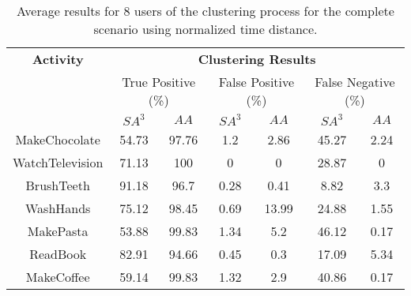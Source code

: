 \begin{table}[htbp]\scriptsize
  \begin{center}
        \begin{tabular}{ccccccc}
            \hline            
            \textbf{Activity} & \multicolumn{6}{c}{\textbf{Clustering Results}} \\
             & \multicolumn{2}{c}{True Positive (\%)} & \multicolumn{2}{c}{False Positive (\%)} & \multicolumn{2}{c}{False Negative (\%)} \\
             & $SA^3$ & $AA$ & $SA^3$ & $AA$ & $SA^3$ & $AA$ \\
            \hline
            MakeChocolate   & 54.73 & 97.76 & 1.2  & 2.86 & 45.27 & 2.24 \\
	    WatchTelevision & 71.13 & 100   & 0    & 0    & 28.87 & 0    \\
	    BrushTeeth      & 91.18 & 96.7  & 0.28 & 0.41 & 8.82  & 3.3 \\
	    WashHands       & 75.12 & 98.45 & 0.69 & 13.99  & 24.88 & 1.55 \\
	    MakePasta       & 53.88 & 99.83 & 1.34 & 5.2 & 46.12 & 0.17 \\
	    ReadBook        & 82.91 & 94.66 & 0.45 & 0.3  & 17.09 & 5.34 \\
	    MakeCoffee      & 59.14 & 99.83 & 1.32 & 2.9  & 40.86 & 0.17 \\
            \hline
        \end{tabular}
        \caption{Average results for 8 users of the clustering process for the complete scenario using normalized time distance.}
        \label{tab-r-comp-t1}
    \end{center}
\end{table}

